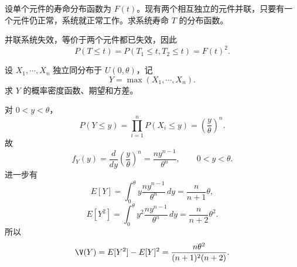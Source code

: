 \begin{question}
设单个元件的寿命分布函数为 $F(t)$。现有两个相互独立的元件并联，只要有一个元件仍正常，系统就正常工作。求系统寿命 $T$ 的分布函数。
\begin{solution}
并联系统失效，等价于两个元件都已失效，因此
\[
P(T\le t)=P(T_1\le t,T_2\le t)=F(t)^2.
\]
\end{solution}
\end{question}

\begin{question}
设 $X_1,\cdots,X_n$ 独立同分布于 $U(0,\theta)$，记
\[
Y=\max(X_1,\cdots,X_n).
\]
求 $Y$ 的概率密度函数、期望和方差。
\begin{solution}
对 $0<y<\theta$，
\[
P(Y\le y)=\prod_{i=1}^n P(X_i\le y)=\left(\frac{y}{\theta}\right)^n.
\]
故
\[
f_Y(y)=\frac{d}{dy}\left(\frac{y}{\theta}\right)^n
=\frac{n y^{n-1}}{\theta^n},\qquad 0<y<\theta.
\]
进一步有
\[
E[Y]=\int_0^\theta y\frac{n y^{n-1}}{\theta^n}\,dy
=\frac{n}{n+1}\theta,
\]
\[
E[Y^2]=\int_0^\theta y^2\frac{n y^{n-1}}{\theta^n}\,dy
=\frac{n}{n+2}\theta^2.
\]
所以
\[
\V(Y)=E[Y^2]-E[Y]^2
=\frac{n\theta^2}{(n+1)^2(n+2)}.
\]
\end{solution}
\end{question}


